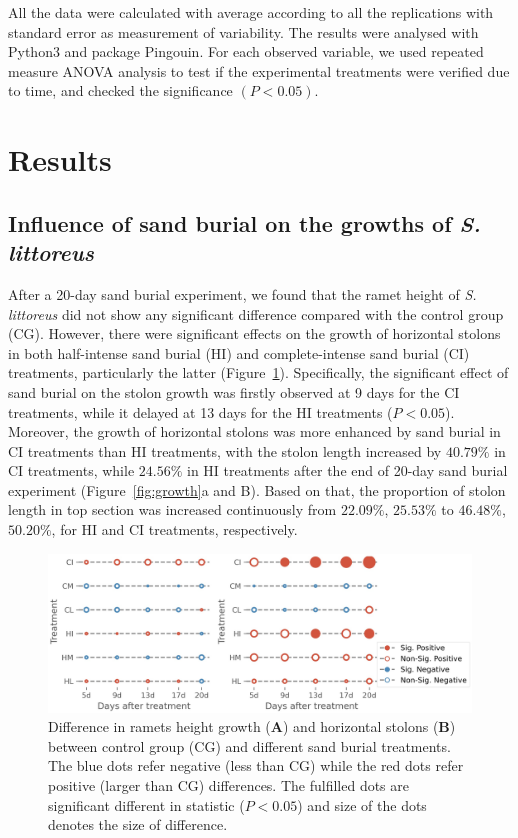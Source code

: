 \documentclass[]{interact}
\theoremstyle{plain}%
\theoremstyle{definition}
\theoremstyle{remark}
\begin{document}
All the data were calculated with average according to all the replications with standard error as measurement of variability. The results were analysed with Python3 and package Pingouin. For each observed variable, we used repeated measure ANOVA analysis to test if the experimental treatments were verified due to time, and checked the significance $(P<0.05)$.

\section{Results}

\subsection{Influence of sand burial on the growths of \textit{S. littoreus}}

After a 20-day sand burial experiment, we found that the ramet height of \textit{S. littoreus} did not show any significant difference compared with the control group (CG). However, there were significant effects on the growth of horizontal stolons in both half-intense sand burial (HI) and complete-intense sand burial (CI) treatments, particularly the latter (Figure~\ref{fig:lattice}). 
Specifically, the significant effect of sand burial on the stolon growth was firstly observed at 9 days for the CI treatments, while it delayed at 13 days for the HI treatments ($P<0.05$).
Moreover, the growth of horizontal stolons was more enhanced by sand burial in CI treatments than HI treatments, with the stolon length increased by $40.79\%$ in CI treatments, while $24.56\%$ in HI treatments after the end of 20-day sand burial experiment (Figure~\ref{fig:growth}a and B).
Based on that, the proportion of stolon length in top section was increased continuously from $22.09\%$, $25.53\%$ to $46.48\%$, $50.20\%$, for HI and CI treatments, respectively.

\begin{figure}[!h]
  \centering
  \includegraphics[scale=0.7]{../figs/grid_differences.jpg}
  \caption{
    Difference in ramets height growth (\textbf{A}) and horizontal stolons (\textbf{B}) between control group (CG) and different sand burial treatments. The blue dots refer negative (less than CG) while the red dots refer positive (larger than CG) differences. The fulfilled dots are significant different in statistic ($P<0.05$) and size of the dots denotes the size of difference.  
  } 
  \label{fig:lattice}
\end{figure}
\end{document}
